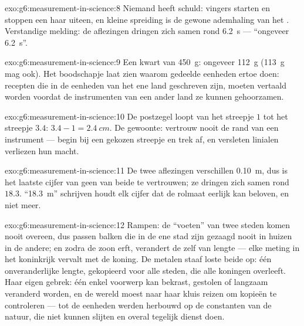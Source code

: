 \begin{solution}{exo:g6:measurement-in-science:8}
Niemand heeft schuld: vingers starten en stoppen een haar uiteen, en
kleine spreiding is de gewone ademhaling van het . Verstandige
melding: de aflezingen dringen zich samen rond \qty{6.2}{s} ---
``ongeveer \qty{6.2}{s}''.
\end{solution}

\begin{solution}{exo:g6:measurement-in-science:9}
Een kwart van \qty{450}{g}: ongeveer \qty{112}{g} (\qty{113}{g} mag
ook). Het boodschapje laat zien waarom gedeelde eenheden ertoe doen:
recepten die in de eenheden van het ene land geschreven zijn, moeten
vertaald worden voordat de instrumenten van een ander land ze kunnen
gehoorzamen.
\end{solution}

\begin{solution}{exo:g6:measurement-in-science:10}
De postzegel loopt van het streepje $1$ tot het streepje $3.4$:
$3.4 - 1 = \qty{2.4}{cm}$. De gewoonte: vertrouw nooit de rand van een
instrument --- begin bij een gekozen streepje en trek af, en versleten
linialen verliezen hun macht.
\end{solution}

\begin{solution}{exo:g6:measurement-in-science:11}
De twee aflezingen verschillen \qty{0.10}{m}, dus is het laatste
cijfer van geen van beide te vertrouwen; ze dringen zich samen rond
$18.3$. ``\qty{18.3}{m}'' schrijven houdt elk cijfer dat de rolmaat
eerlijk kan beloven, en niet meer.
\end{solution}

\begin{solution}{exo:g6:measurement-in-science:12}
Rampen: de ``voeten'' van twee steden komen nooit overeen, dus passen
balken die in de ene stad zijn gezaagd nooit in huizen in de andere;
en zodra de zoon erft, verandert de  zelf van lengte --- elke
meting in het koninkrijk vervalt met de koning. De metalen staaf loste
beide op: één onveranderlijke lengte, gekopieerd voor alle steden, die
alle koningen overleeft. Haar eigen gebrek: één enkel voorwerp kan
bekrast, gestolen of langzaam veranderd worden, en de wereld moest
naar haar kluis reizen om kopieën te controleren --- tot de
eenheden werden herbouwd op de constanten van de natuur, die niet
kunnen slijten en overal tegelijk dienst doen.
\end{solution}

